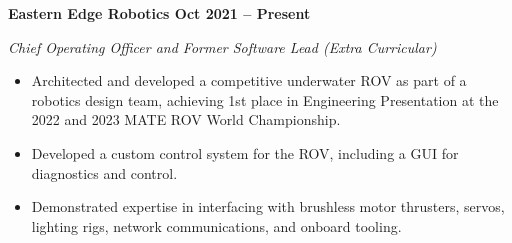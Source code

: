 \vspace{0.1cm}
\textbf{Eastern Edge Robotics \hfill Oct 2021 -- Present} \par
\textit{Chief Operating Officer and Former Software Lead (Extra Curricular)} \par
\begin{itemize}
	\item Architected and developed a competitive underwater ROV as part of a robotics design team, achieving 1st place in Engineering Presentation at the 2022 and 2023 MATE ROV World Championship.
  \item Developed a custom control system for the ROV, including a GUI for diagnostics and control.
  \item Demonstrated expertise in interfacing with brushless motor thrusters, servos, lighting rigs, network communications, and onboard tooling.
\end{itemize} \par